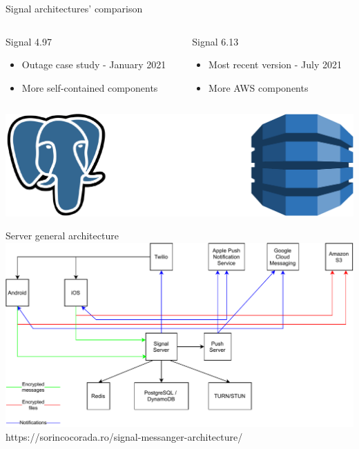 \documentclass{beamer}
\begin{document}
\begin{frame}{Signal architectures' comparison}
    \begin{columns}[t]
        \begin{column}{.4\textwidth}
            Signal 4.97
            \begin{itemize}
                \item Outage case study - January 2021
                \item More self-contained components
            \end{itemize}
        \end{column}
        \begin{column}{.4\textwidth}
            Signal 6.13
            \begin{itemize}
                \item Most recent version - July 2021
                \item More AWS components
            \end{itemize}
        \end{column}
    \end{columns}

    \vfill

    \centering
    \includegraphics[width=.7\textwidth]{img/postgresql-dynamodb}
\end{frame}

\begin{frame}{Server general architecture}
    \centering
    \includegraphics[width=.9\textwidth]{img/Architecture}
    https://sorincocorada.ro/signal-messanger-architecture/
\end{frame}
\end{document}
